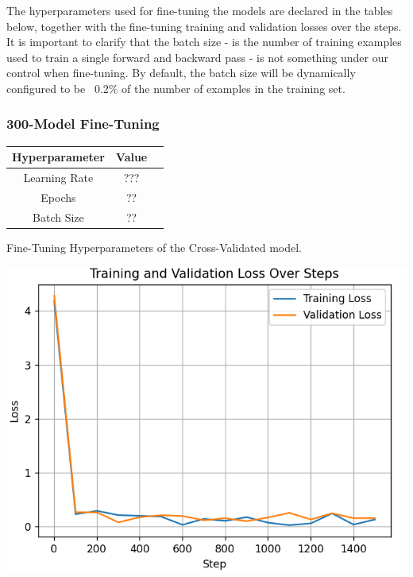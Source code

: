 \documentclass[10pt,twocolumn,letterpaper]{article}
\begin{document}
The hyperparameters used for fine-tuning the models are declared in 
the tables below, together with the fine-tuning training and validation losses over the steps.
It is important to clarify that the batch size - is the number of training examples used to train a single forward and backward pass - is not something under our control when fine-tuning.
By default, the batch size will be dynamically configured to be ~0.2\% of the number of examples in the training set.


\subsubsection*{300-Model Fine-Tuning}


\begin{center}

    \begin{tabular}{ccc}
        \toprule
        Hyperparameter & Value \\
        \midrule
        Learning Rate & ??? \\
        Epochs & ?? \\
        Batch Size & ?? \\
        \bottomrule
    \end{tabular}
\end{center} 

\begin{center}
    \small {Fine-Tuning Hyperparameters of the Cross-Validated model.} 
\end{center}

\begin{center}
\includegraphics*[scale=0.55]{img/training_loss_full.png} 
\end{center}
\end{document}
